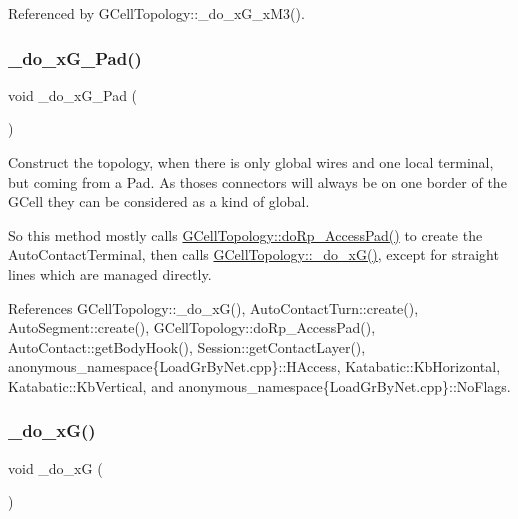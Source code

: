 Referenced by G\+Cell\+Topology\+::\+\_\+do\+\_\+x\+G\+\_\+x\+M3().

\mbox{\label{group__LoadGlobalRouting_gabe00ab10a0dab8a3d2de0709e61e4e7d}} 
\subsubsection{\texorpdfstring{\+\_\+do\+\_\+x\+G\+\_\+Pad()}{\_do\_xG\_1Pad()}}
{\footnotesize\ttfamily void \+\_\+do\+\_\+x\+G\+\_\+Pad (\begin{DoxyParamCaption}{ }\end{DoxyParamCaption})\hspace{0.3cm}{\ttfamily [private]}}

Construct the topology, when there is only global wires and one local terminal, but coming from a Pad. As thoses connectors will always be on one border of the G\+Cell they can be considered as a kind of global.

So this method mostly calls \mbox{\hyperlink{group__LoadGlobalRouting_ga60edeea78b56db072fc26a58a7afbcd4}{G\+Cell\+Topology\+::do\+Rp\+\_\+\+Access\+Pad()}} to create the Auto\+Contact\+Terminal, then calls \mbox{\hyperlink{group__LoadGlobalRouting_gaaa6d4ccd2eadfb6bc3e2cc98cfaf2cca}{G\+Cell\+Topology\+::\+\_\+do\+\_\+x\+G()}}, except for straight lines which are managed directly. 

References G\+Cell\+Topology\+::\+\_\+do\+\_\+x\+G(), Auto\+Contact\+Turn\+::create(), Auto\+Segment\+::create(), G\+Cell\+Topology\+::do\+Rp\+\_\+\+Access\+Pad(), Auto\+Contact\+::get\+Body\+Hook(), Session\+::get\+Contact\+Layer(), anonymous\+\_\+namespace\{\+Load\+Gr\+By\+Net.\+cpp\}\+::\+H\+Access, Katabatic\+::\+Kb\+Horizontal, Katabatic\+::\+Kb\+Vertical, and anonymous\+\_\+namespace\{\+Load\+Gr\+By\+Net.\+cpp\}\+::\+No\+Flags.

\mbox{\label{group__LoadGlobalRouting_gaaa6d4ccd2eadfb6bc3e2cc98cfaf2cca}} 
\subsubsection{\texorpdfstring{\+\_\+do\+\_\+x\+G()}{\_do\_xG()}}
{\footnotesize\ttfamily void \+\_\+do\+\_\+xG (\begin{DoxyParamCaption}{ }\end{DoxyParamCaption})\hspace{0.3cm}{\ttfamily [private]}}

